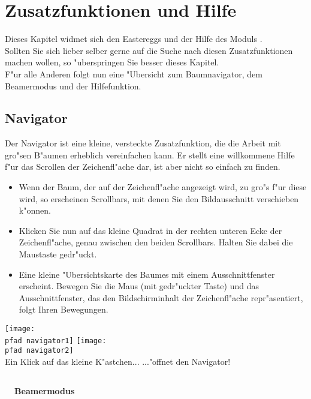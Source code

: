 
\section{Zusatzfunktionen und Hilfe}
Dieses Kapitel widmet sich den Eastereggs und der Hilfe des Moduls \AVL . \\
Sollten Sie sich lieber selber gerne auf die Suche nach diesen Zusatzfunktionen machen wollen, so "uberspringen Sie besser
dieses Kapitel. \\
F"ur alle Anderen folgt nun eine "Ubersicht zum Baumnavigator, dem Beamermodus und der Hilfefunktion. \\


\subsection{Navigator}
Der Navigator ist eine kleine, versteckte Zusatzfunktion, die die Arbeit mit gro"sen B"aumen erheblich vereinfachen kann.
Er stellt eine willkommene Hilfe f"ur das Scrollen der Zeichenfl"ache dar, ist aber nicht so einfach zu finden. \\
\begin{itemize}
	\item Wenn der Baum, der auf der Zeichenfl"ache angezeigt wird, zu gro"s f"ur diese wird, so erscheinen Scrollbars, 
			mit denen Sie den Bildausschnitt verschieben k"onnen.
	\item Klicken Sie nun auf das kleine Quadrat in der rechten unteren Ecke der Zeichenfl"ache, genau zwischen den beiden
			Scrollbars. Halten Sie dabei die Maustaste gedr"uckt.
	\item Eine kleine "Ubersichtskarte des Baumes mit einem Ausschnittfenster erscheint. Bewegen Sie die Maus (mit 
			gedr"uckter Taste) und das Ausschnittfenster, das den Bildschirminhalt der Zeichenfl"ache repr"asentiert, 
			folgt Ihren Bewegungen.
\end{itemize}

\bigskip
\begin{center}
	\texttt{[image: \\pfad navigator1]} \hfill
	\texttt{[image: \\pfad navigator2]} \\
	Ein Klick auf das kleine K"astchen... \hfill ..."offnet den Navigator!
\end{center}

\medskip
\subsection[Beamermodus]{}
\vspace{-4.3ex} {\bf {\large  \qquad \quad \ \ Beamermodus}} 

